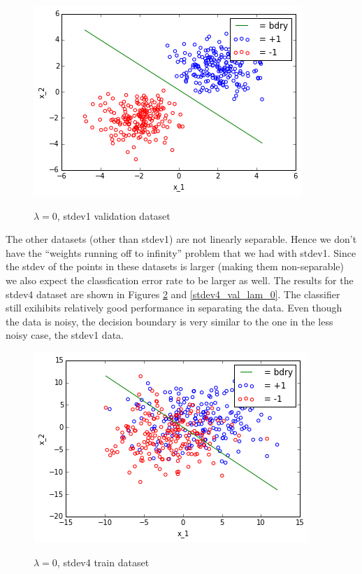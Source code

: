 \documentclass[10pt]{article}
\begin{document}
\begin{figure}
 \centering
 \includegraphics[scale=0.5]{stdev1_val_lam_0.png}
 \label{stdev1_val_lam_0}
 \caption{$\lambda = 0$, stdev1 validation dataset}
 \end{figure}

The other datasets (other than stdev1) are not linearly separable. Hence we don't have the ``weights running off to infinity'' problem that we had with stdev1. Since the stdev of the points in these datasets is larger (making them non-separable) we also expect the classfication error rate to be larger as well. The results for the stdev4 dataset are shown in Figures \ref{stdev4_train_lam_0} and \ref{stdev4_val_lam_0}. The classifier still exihibits relatively good performance in separating the data. Even though the data is noisy, the decision boundary is very similar to the one in the less noisy case, the stdev1 data.
\begin{figure}
 \centering
 \includegraphics[scale=0.5]{stdev4_train_lam_0.png}
 \label{stdev4_train_lam_0}
 \caption{$\lambda = 0$, stdev4 train dataset}
 \end{figure}
\end{document}
